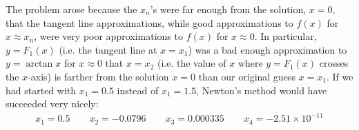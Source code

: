 \begin{eg}
The problem arose because the $x_n$'s were far enough from the solution, $x=0$, that the tangent line approximations,
while good approximations to $f(x)$ for $x\approx x_n$, were very 
poor approximations to $f(x)$ for $x\approx 0$. 
In particular, $y=F_1(x)$ (i.e. the tangent line at $x=x_1$)
was a bad enough approximation to $y=\arctan x$ for $x\approx0$ that $x=x_2$ (i.e. the value of $x$ where $y=F_1(x)$ crosses the $x$-axis) is farther from the solution $x=0$ than our original guess $x=x_1$. If we had started with
$x_1=0.5$ instead of $x_1=1.5$, Newton's method would have succeeded very nicely:
\begin{align*}
x_1=0.5\qquad
x_2=-0.0796\qquad
x_3=0.000335\qquad
x_4=-2.51\times 10^{-11}
\end{align*}

\end{eg}

